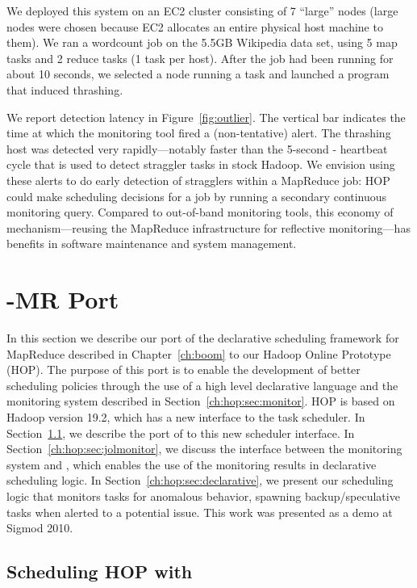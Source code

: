 We deployed this system on an EC2 cluster consisting of 7 ``large''
nodes (large nodes were chosen because EC2 allocates an entire
physical host machine to them). We ran a wordcount job on the 5.5GB Wikipedia
data set, using 5 map tasks and 2 reduce tasks (1 task per host). After
the job had been running for about 10 seconds, we selected a node
running a task and launched a program that induced thrashing.

We report detection latency in Figure~\ref{fig:outlier}. The vertical bar
indicates the time at which the monitoring tool fired a (non-tentative)
alert. The thrashing host was detected very rapidly---notably faster than the
5-second {\TT}-{\JT} heartbeat cycle that is used to detect straggler tasks in
stock Hadoop. We envision using these alerts to do early detection of stragglers
within a MapReduce job: HOP could make scheduling decisions for a job by running
a secondary continuous monitoring query. Compared to out-of-band monitoring
tools, this economy of mechanism---reusing the MapReduce infrastructure for
reflective monitoring---has benefits in software maintenance and system
management.

\section{\BOOM-MR Port}

In this section we describe our port of the declarative scheduling framework
for MapReduce described in Chapter~\ref{ch:boom} to our Hadoop Online Prototype (HOP). The purpose
of this port is to enable the development of better scheduling policies through the use of a high level
declarative language and the monitoring system described in Section~\ref{ch:hop:sec:monitor}. HOP is
based on Hadoop version 19.2, which has a new interface to the task scheduler. In Section~\ref{ch:hop:sec:jolport}, 
we describe the port of \JOL to this new scheduler interface. In Section~\ref{ch:hop:sec:jolmonitor}, we discuss the interface between
the monitoring system and \JOL, which enables the use of the monitoring results in declarative scheduling 
logic. In Section~\ref{ch:hop:sec:declarative}, we present our scheduling logic that monitors tasks for anomalous behavior, spawning
backup/speculative tasks when alerted to a potential issue. This work was presented as a demo at Sigmod 2010.

\subsection{Scheduling HOP with \JOL}
\label{ch:hop:sec:jolport}

